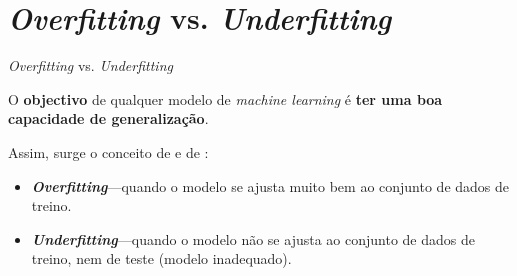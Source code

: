 \section{\textit{Overfitting} vs. \textit{Underfitting}}

\begin{frame}{\textit{Overfitting} vs. \textit{Underfitting}}
    
    O \textbf{objectivo} de qualquer modelo de \textit{machine learning} é \textbf{ter uma boa capacidade de generalização}.
    
    \pauseskip
    
    Assim, surge o conceito de  e de :
    \begin{itemize}
        \item \textbf{\textit{Overfitting}}---quando o modelo se ajusta muito bem ao conjunto de dados de treino.
        \medskip
        \item \textbf{\textit{Underfitting}}---quando o modelo não se ajusta ao conjunto de dados de treino, nem de teste (modelo inadequado).
    \end{itemize}
    
    \medskip
    

\end{frame}
